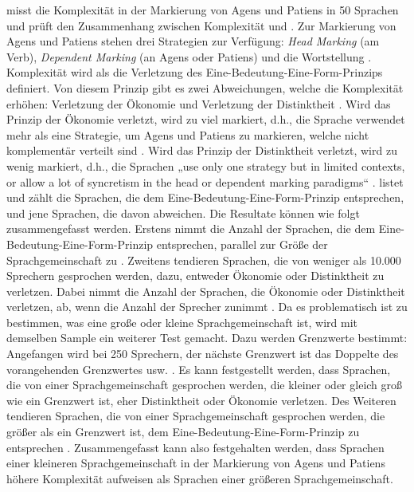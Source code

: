 \citet{Sinnemäki2009} misst die Komplexität in der Markierung von Agens und Patiens in 50 Sprachen und prüft den Zusammenhang zwischen Komplexität und . Zur Markierung von Agens und Patiens stehen drei Strategien zur Verfügung: \textit{Head Marking} (am Verb), \textit{Dependent Marking} (an Agens oder Patiens) und die Wortstellung \citep[130]{Sinnemäki2009}. Komplexität wird als die Verletzung des Eine-Bedeutung-Eine-Form-Prinzips definiert. Von diesem Prinzip gibt es zwei Abweichungen, welche die Komplexität erhöhen: Verletzung der Ökonomie und Verletzung der Distinktheit \citep[132]{Sinnemäki2009}. Wird das Prinzip der Ökonomie verletzt, wird zu viel markiert, d.h., die Sprache verwendet mehr als eine Strategie, um Agens und Patiens zu markieren, welche nicht komplementär verteilt sind \citep[133]{Sinnemäki2009}. Wird das Prinzip der Distinktheit verletzt, wird zu wenig markiert, d.h., die Sprachen „use only one strategy but in limited contexts, or allow a lot of syncretism in the head or dependent marking paradigms“ \citep[133]{Sinnemäki2009}. \citet{Sinnemäki2009} listet und zählt die Sprachen, die dem Eine-Bedeutung-Eine-Form-Prinzip entsprechen, und jene Sprachen, die davon abweichen. Die Resultate können wie folgt zusammengefasst werden. Erstens nimmt die Anzahl der Sprachen, die dem Eine-Bedeutung-Eine-Form-Prinzip entsprechen, parallel zur Größe der Sprachgemeinschaft zu \citep[135]{Sinnemäki2009}. Zweitens tendieren Sprachen, die von weniger als 10.000 Sprechern gesprochen werden, dazu, entweder Ökonomie oder Distinktheit zu verletzen. Dabei nimmt die Anzahl der Sprachen, die Ökonomie oder Distinktheit verletzen, ab, wenn die Anzahl der Sprecher zunimmt \citep[135]{Sinnemäki2009}. Da es problematisch ist zu bestimmen, was eine große oder kleine Sprachgemeinschaft ist, wird mit demselben Sample ein weiterer Test gemacht. Dazu werden Grenzwerte bestimmt: Angefangen wird bei 250 Sprechern, der nächste Grenzwert ist das Doppelte des vorangehenden Grenzwertes usw. \citep[135]{Sinnemäki2009}. Es kann festgestellt werden, dass Sprachen, die von einer Sprachgemeinschaft gesprochen werden, die kleiner oder gleich groß wie ein Grenzwert ist, eher Distinktheit oder Ökonomie verletzen. Des Weiteren tendieren Sprachen, die von einer Sprachgemeinschaft gesprochen werden, die größer als ein Grenzwert ist, dem Eine-Bedeutung-Eine-Form-Prinzip zu entsprechen \citep[136--138]{Sinnemäki2009}. Zusammengefasst kann also festgehalten werden, dass Sprachen einer kleineren Sprachgemeinschaft in der Markierung von Agens und Patiens höhere Komplexität aufweisen als Sprachen einer größeren Sprachgemeinschaft.


